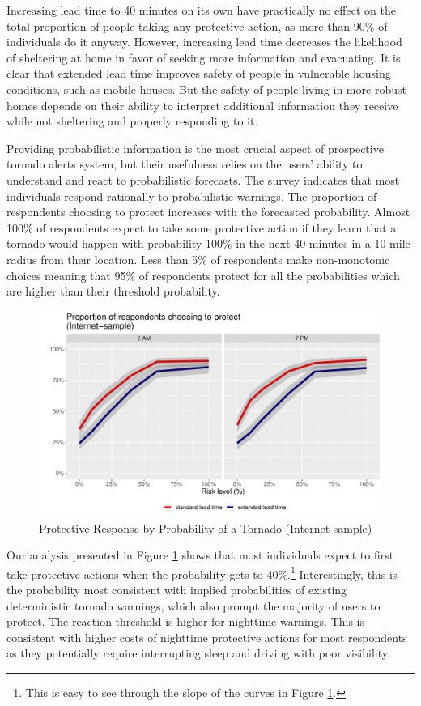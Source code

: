 \documentclass{ametsocV6.1}
\begin{document}
Increasing lead time to 40 minutes on its own have practically no effect on the total proportion of people taking any protective action, as more than 90\% of individuals do it anyway. However, increasing lead time decreases the likelihood of sheltering at home in favor of seeking more information and evacuating. It is clear that extended lead time improves safety of people in vulnerable housing conditions, such as mobile houses. But the safety of people living in more robust homes depends on their ability to interpret additional information they receive while not sheltering and properly responding to it.

Providing probabilistic information is the most crucial aspect of prospective tornado alerts system, but their usefulness relies on the users' ability to understand and react to probabilistic forecasts. The survey indicates that most individuals respond rationally to probabilistic warnings. The proportion of respondents choosing to protect increases with the forecasted probability. Almost 100\% of respondents expect to take some protective action if they learn that a tornado would happen with probability 100\% in the next 40 minutes in a 10 mile radius from their location. Less than 5\% of respondents make non-monotonic choices meaning that 95\% of respondents protect for all the probabilities which are higher than their threshold probability.
\begin{figure}[!htbp]
\centering
\includegraphics[width=33pc]{../Graphs/threat_resp_allQ.pdf} 
\caption{Protective Response by Probability of a Tornado (Internet sample)}\label{threat_respQ}
\end{figure}
Our analysis presented in Figure \ref{threat_respQ} shows that most individuals expect to first take protective actions when the probability gets to 40\%.\footnote{This is easy to see through the slope of the curves in Figure \ref{threat_respQ}.} Interestingly, this is the probability most consistent with implied probabilities of existing deterministic tornado warnings, which also prompt the majority of users to protect. The reaction threshold is higher for nighttime warnings. This is consistent with higher costs of nighttime protective actions for most respondents as they potentially require interrupting sleep and driving with poor visibility.
\end{document}
